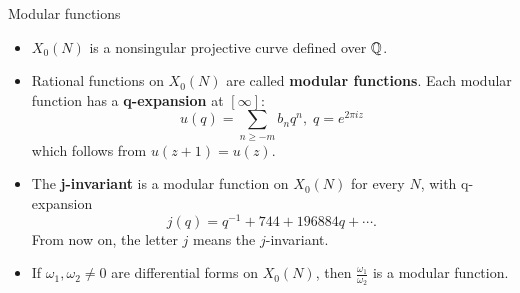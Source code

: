 \documentclass[handout]{beamer}
\begin{document}
\begin{frame}{Modular functions}

\begin{itemize}
\item $X_0(N)$ is a nonsingular  projective curve defined over $\mathbb{Q}$.

\pause
\item Rational functions on $X_0(N)$ are called {\bf modular functions}. Each modular function has a {\bf q-expansion} at $[\infty]$:
\[
	u(q)  = \sum_{n \geq -m} b_n q^n, \; q = e^{2 \pi i z}
\]
which follows from $u(z+1) = u(z)$. 

\pause
\item The {\bf j-invariant} is a modular function on $X_0(N)$ for every $N$, with q-expansion
\[
	j(q) = q^{-1} + 744 + 196884q+ \cdots.
\]
From now on, the letter $j$ means the $j$-invariant. 

\pause

\item If $\omega_1, \omega_2 \neq 0$ are differential forms on $X_0(N)$, then  $\frac{\omega_1}{\omega_2}$ is 
a modular function.  %
\end{itemize}

\end{frame}
\end{document}
